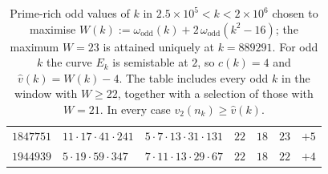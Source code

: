 \documentclass[12pt]{amsart}%
\newcommand{\1}{\mathds{1}}
\theoremstyle{definition}
\numberwithin{equation}{section}
\numberwithin{table}{section}
\numberwithin{figure}{section}
\begin{document}
\begin{table}[htbp]
\begin{tabular}{r l l c c c c}
$1847751$ & $11\cdot17\cdot41\cdot241$              & $5\cdot7\cdot13\cdot31\cdot131$         & $22$ & $18$ & $23$ & $+5$\\
$1944939$ & $5\cdot19\cdot59\cdot347$               & $7\cdot11\cdot13\cdot29\cdot67$         & $22$ & $18$ & $22$ & $+4$\\
\bottomrule
\end{tabular}
\caption{Prime-rich odd values of $k$ in $2.5\times10^{5}<k<2\times10^{6}$ chosen to
maximise $W(k):=\omega_{\mathrm{odd}}(k)+2\,\omega_{\mathrm{odd}}(k^2-16)$; the maximum
$W=23$ is attained uniquely at $k=889291$. For odd $k$ the curve $E_k$ is semistable at
$2$, so $c(k)=4$ and $\hat v(k)=W(k)-4$. The table includes every odd $k$ in the window
with $W\ge22$, together with a selection of those with $W=21$. In every case
$v_2(n_k)\ge\hat v(k)$. }
\label{tab:largeW-odd}
\end{table}
\end{document}
